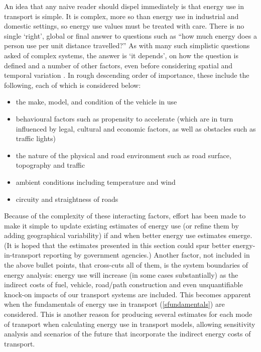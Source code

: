 An idea that any naive reader should dispel immediately is that energy use in
transport is simple. It is complex, more so than energy use in industrial and
domestic settings, so energy use values must be treated with care.
There is no single `right', global or final answer to questions such as
``how much energy does a
person use per unit distance travelled?'' As with many such simplistic questions
asked of complex systems, the answer is `it depends', on how the question
is defined and a number of other factors, even before
considering spatial and temporal variation
\citep{Agency2005, Fels1973, Lenzen1999}. In rough descending order of importance, these
include the following, each of which is considered below:
\begin{itemize}
 \item the make, model, and condition of the vehicle in use
 \item behavioural factors such as propensity to accelerate (which are in
 turn influenced by legal, cultural and economic factors, as well as obstacles such as traffic lights)
 \item the nature of the physical and road environment such as road surface, topography and traffic
 \item ambient conditions including temperature and wind
 \item circuity and straightness of roads
\end{itemize}
Because of the complexity of these interacting factors,
effort has been made to make it simple to update existing estimates of energy
use (or refine them by adding geographical variability) if and when better
energy use estimates emerge. (It is hoped that the estimates presented in this
section could spur better energy-in-transport reporting by government agencies.)
Another factor, not included in the above bullet points, that cross-cuts all
of them, is the system boundaries of energy analysis: energy use will increase
(in some cases substantially) as the indirect costs of fuel,
vehicle, road/path construction and even unquantifiable knock-on impacts of
our transport systems are included. This becomes apparent when
the fundamentals of energy use in transport (\cref{sfundamentals}) are
considered. This is another reason for producing several estimates
for each mode of transport when calculating energy
use in transport models, allowing sensitivity
analysis and scenarios of the future that incorporate the indirect energy costs
of transport.

